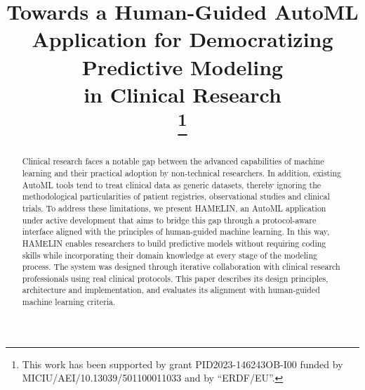 \documentclass[conference,twocolumn]{IEEEtran}
\begin{document}
\title{Towards a Human-Guided AutoML Application for Democratizing Predictive Modeling\\ in Clinical Research\\
\thanks{This work has been supported by grant  PID2023-146243OB-I00 funded by MICIU/AEI/10.13039/501100011033 and by ``ERDF/EU''.}
}

\author{
\and
{}
\and
{}
\and
{}
}

\maketitle

\begin{abstract}
Clinical research faces a notable gap between the advanced capabilities of machine learning and their practical adoption by non-technical researchers. In addition, existing AutoML tools tend to treat clinical data as generic datasets, thereby ignoring the methodological particularities of patient registries, observational studies and clinical trials. To address these limitations, we present HAMELIN, an AutoML application under active development that aims to bridge this gap through a protocol-aware interface aligned with the principles of human-guided machine learning. In this way, HAMELIN enables researchers to build predictive models without requiring coding skills while incorporating their domain knowledge at every stage of the modeling process. The system was designed through iterative collaboration with clinical research professionals using real clinical protocols. This paper describes its design principles, architecture and implementation, and evaluates its alignment with human-guided machine learning criteria.
\end{abstract}
\end{document}
